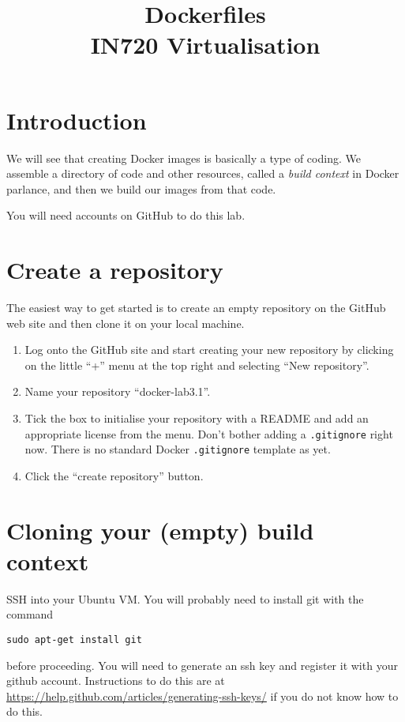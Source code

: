 \documentclass{article}
\begin{document}
\title{Dockerfiles\\ IN720 Virtualisation}
\date{}
\maketitle

\section*{Introduction}
We will  see that creating Docker images is basically a type of coding.  We assemble a directory of code and other resources, called a \emph{build context} in Docker parlance, and then we build our images from that code.  

You will need accounts on GitHub to do this lab.

\section{Create a repository}
The easiest way to get started is to create an empty repository on the GitHub web site and then clone it on your local machine.  
\begin{enumerate}
	\item Log onto the GitHub site and start creating your new repository by clicking on the little ``+'' menu at the top right and selecting ``New repository''.
	\item Name your repository ``docker-lab3.1''. 
	\item Tick the box to initialise your repository with a README and add an appropriate license from the menu.  Don't bother adding a \texttt{.gitignore} right now.  There is no standard Docker \texttt{.gitignore} template as yet.
	\item Click the ``create repository'' button.
\end{enumerate}
     


\section{Cloning your (empty) build context}
SSH into your Ubuntu VM. You will probably need to install git with the command

\texttt{sudo apt-get install git}

before proceeding.  You will need to generate an ssh key and register it with your github account.  Instructions to do this are at \url{https://help.github.com/articles/generating-ssh-keys/} if you do not know how to do this.
\end{document}
